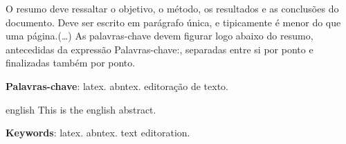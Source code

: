 \documentclass[
	12pt,				%
	openright,			%
	oneside,			%
	a4paper,			%
	english,			%
	french,				%
	spanish,			%
	brazil				%
	]{abntex2}
\begin{document}


\setlength{\absparsep}{18pt} %
\begin{resumo}
 O resumo deve ressaltar o  objetivo, o método, os resultados e as conclusões do documento. 
 Deve ser escrito em parágrafo única, e tipicamente é menor do que uma página.(\ldots) 
 As palavras-chave devem figurar logo abaixo do resumo, antecedidas da expressão Palavras-chave:, separadas entre si por ponto e finalizadas também por ponto.

 \textbf{Palavras-chave}: latex. abntex. editoração de texto.
\end{resumo}

\begin{resumo}[Abstract]
 \begin{otherlanguage*}{english}
   This is the english abstract.

   \vspace{\onelineskip}
 
   \noindent 
   \textbf{Keywords}: latex. abntex. text editoration.
 \end{otherlanguage*}
\end{resumo}

 

  
\end{document}
